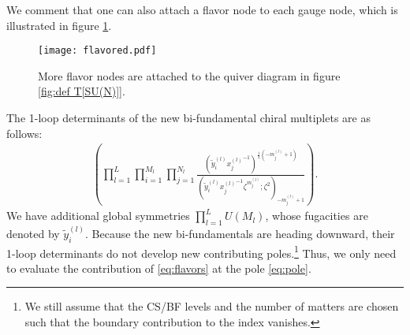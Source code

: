 \documentclass[a4paper,11pt]{article}
\begin{document}
We comment that one can also attach a flavor node to each gauge node, which is illustrated in figure \ref{fig:flavored}.
%
\begin{figure}[tbp]
\centering %
\texttt{[image: flavored.pdf]}
\caption{\label{fig:flavored} More flavor nodes are attached to the quiver diagram in figure \ref{fig:def T[SU(N)]}.}
\end{figure}
%
The 1-loop determinants of the new bi-fundamental chiral multiplets are as follows:
\begin{align}
\label{eq:flavors}
\left(\prod_{l = 1}^L \prod_{i = 1}^{M_l} \prod_{j = 1}^{N_l} \frac{\left(\tilde y^{(l)}_i {x^{(l)}_j}^{-1}\right)^{\frac{1}{2} (-m^{(l)}_j+1)}}{\left(\tilde y^{(l)}_i {x^{(l)}_j}^{-1} \zeta^{m^{(l)}_j};\zeta^2\right)_{-m^{(l)}_j+1}}\right).
\end{align}
We have additional global symmetries $\prod_{l = 1}^L U(M_l)$, whose fugacities are denoted by $\tilde y^{(l)}_i$. Because the new bi-fundamentals are heading downward, their 1-loop determinants do not develop new contributing poles.\footnote{We still assume that the CS/BF levels and the number of matters are chosen such that the boundary contribution to the index vanishes.} Thus, we only need to evaluate the contribution of \eqref{eq:flavors} at the pole \eqref{eq:pole}.
%
\end{document}

